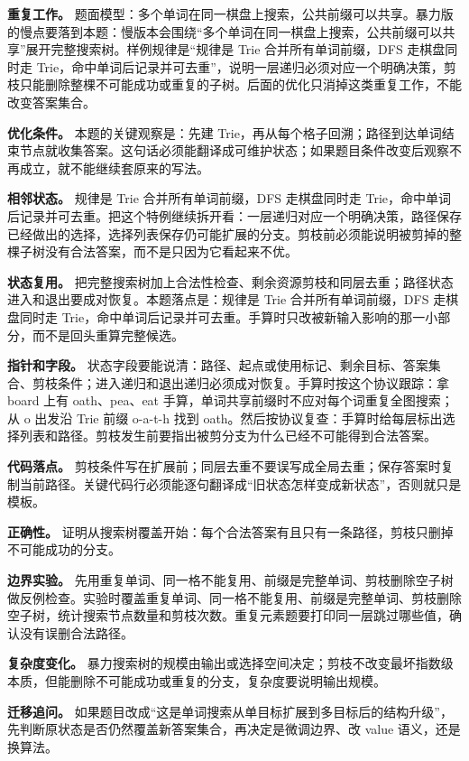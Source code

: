 \textbf{重复工作。} 题面模型：多个单词在同一棋盘上搜索，公共前缀可以共享。暴力版的慢点要落到本题：慢版本会围绕“多个单词在同一棋盘上搜索，公共前缀可以共享”展开完整搜索树。样例规律是“规律是 Trie 合并所有单词前缀，DFS 走棋盘同时走 Trie，命中单词后记录并可去重”，说明一层递归必须对应一个明确决策，剪枝只能删除整棵不可能成功或重复的子树。后面的优化只消掉这类重复工作，不能改变答案集合。

\textbf{优化条件。} 本题的关键观察是：先建 Trie，再从每个格子回溯；路径到达单词结束节点就收集答案。这句话必须能翻译成可维护状态；如果题目条件改变后观察不再成立，就不能继续套原来的写法。

\textbf{相邻状态。} 规律是 Trie 合并所有单词前缀，DFS 走棋盘同时走 Trie，命中单词后记录并可去重。把这个特例继续拆开看：一层递归对应一个明确决策，路径保存已经做出的选择，选择列表保存仍可能扩展的分支。剪枝前必须能说明被剪掉的整棵子树没有合法答案，而不是只因为它看起来不优。

\textbf{状态复用。} 把完整搜索树加上合法性检查、剩余资源剪枝和同层去重；路径状态进入和退出要成对恢复。本题落点是：规律是 Trie 合并所有单词前缀，DFS 走棋盘同时走 Trie，命中单词后记录并可去重。手算时只改被新输入影响的那一小部分，而不是回头重算完整候选。

\textbf{指针和字段。} 状态字段要能说清：路径、起点或使用标记、剩余目标、答案集合、剪枝条件；进入递归和退出递归必须成对恢复。手算时按这个协议跟踪：拿 board 上有 oath、pea、eat 手算，单词共享前缀时不应对每个词重复全图搜索；从 o 出发沿 Trie 前缀 o-a-t-h 找到 oath。然后按协议复查：手算时给每层标出选择列表和路径。剪枝发生前要指出被剪分支为什么已经不可能得到合法答案。

\textbf{代码落点。} 剪枝条件写在扩展前；同层去重不要误写成全局去重；保存答案时复制当前路径。关键代码行必须能逐句翻译成“旧状态怎样变成新状态”，否则就只是模板。

\textbf{正确性。} 证明从搜索树覆盖开始：每个合法答案有且只有一条路径，剪枝只删掉不可能成功的分支。

\textbf{边界实验。} 先用重复单词、同一格不能复用、前缀是完整单词、剪枝删除空子树做反例检查。实验时覆盖重复单词、同一格不能复用、前缀是完整单词、剪枝删除空子树，统计搜索节点数量和剪枝次数。重复元素题要打印同一层跳过哪些值，确认没有误删合法路径。

\textbf{复杂度变化。} 暴力搜索树的规模由输出或选择空间决定；剪枝不改变最坏指数级本质，但能删除不可能成功或重复的分支，复杂度要说明输出规模。

\textbf{迁移追问。} 如果题目改成“这是单词搜索从单目标扩展到多目标后的结构升级”，先判断原状态是否仍然覆盖新答案集合，再决定是微调边界、改 value 语义，还是换算法。

